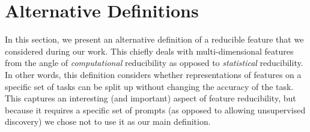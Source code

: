 \documentclass{article} %
\theoremstyle{plain}
\theoremstyle{definition}
\newcommand{\josh}[1]{{\color{orange}{\bf Josh:} #1}}
\begin{document}







\section{Alternative Definitions}
\label{appenxix:alt_definitions}

In this section, we present an alternative definition of a reducible feature that we considered during our work. This chiefly deals with multi-dimensional features from the angle of \textit{computational} reducibility as opposed to \textit{statistical} reducibility. In other words, this definition considers whether representations of features on a specific set of tasks can be split up without changing the accuracy of the task. This captures an interesting (and important) aspect of feature reducibility, but because it requires a specific set of prompts (as opposed to allowing unsupervised discovery) we chose not to use it as our main definition.
\end{document}
